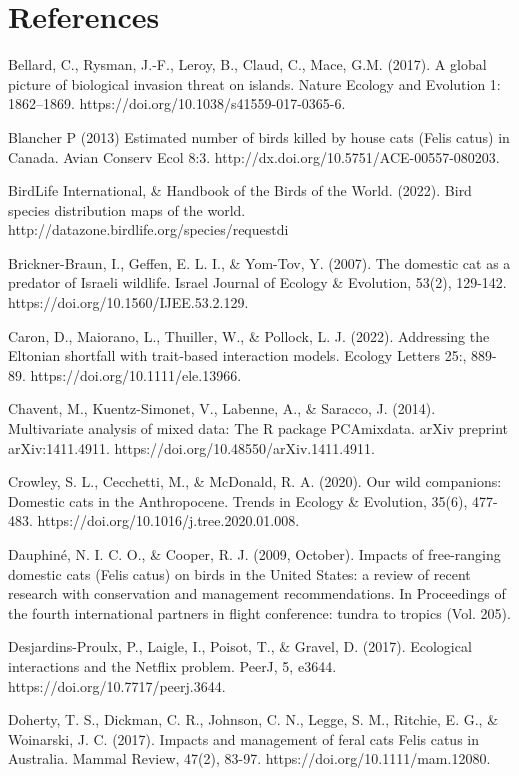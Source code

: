\documentclass[
  super,
  review,
  3p]{elsarticle}
\begin{document}
\hypertarget{references}{%
\section{\texorpdfstring{\textbf{References}}{References}}\label{references}}

Bellard, C., Rysman, J.-F., Leroy, B., Claud, C., Mace, G.M. (2017). A
global picture of biological invasion threat on islands. Nature Ecology
and Evolution 1: 1862--1869. https://doi.org/10.1038/s41559-017-0365-6.

Blancher P (2013) Estimated number of birds killed by house cats (Felis
catus) in Canada. Avian Conserv Ecol 8:3.
http://dx.doi.org/10.5751/ACE-00557-080203.

BirdLife International, \& Handbook of the Birds of the World. (2022).
Bird species distribution maps of the world.
http://datazone.birdlife.org/species/requestdi

Brickner-Braun, I., Geffen, E. L. I., \& Yom-Tov, Y. (2007). The
domestic cat as a predator of Israeli wildlife. Israel Journal of
Ecology \& Evolution, 53(2), 129-142.
https://doi.org/10.1560/IJEE.53.2.129.

Caron, D., Maiorano, L., Thuiller, W., \& Pollock, L. J. (2022).
Addressing the Eltonian shortfall with trait‐based interaction models.
Ecology Letters 25:, 889-89. https://doi.org/10.1111/ele.13966.

Chavent, M., Kuentz-Simonet, V., Labenne, A., \& Saracco, J. (2014).
Multivariate analysis of mixed data: The R package PCAmixdata. arXiv
preprint arXiv:1411.4911. https://doi.org/10.48550/arXiv.1411.4911.

Crowley, S. L., Cecchetti, M., \& McDonald, R. A. (2020). Our wild
companions: Domestic cats in the Anthropocene. Trends in Ecology \&
Evolution, 35(6), 477-483. https://doi.org/10.1016/j.tree.2020.01.008.

Dauphiné, N. I. C. O., \& Cooper, R. J. (2009, October). Impacts of
free-ranging domestic cats (Felis catus) on birds in the United States:
a review of recent research with conservation and management
recommendations. In Proceedings of the fourth international partners in
flight conference: tundra to tropics (Vol. 205).

Desjardins-Proulx, P., Laigle, I., Poisot, T., \& Gravel, D. (2017).
Ecological interactions and the Netflix problem. PeerJ, 5, e3644.
https://doi.org/10.7717/peerj.3644.

Doherty, T. S., Dickman, C. R., Johnson, C. N., Legge, S. M., Ritchie,
E. G., \& Woinarski, J. C. (2017). Impacts and management of feral cats
Felis catus in Australia. Mammal Review, 47(2), 83-97.
https://doi.org/10.1111/mam.12080.
\end{document}
